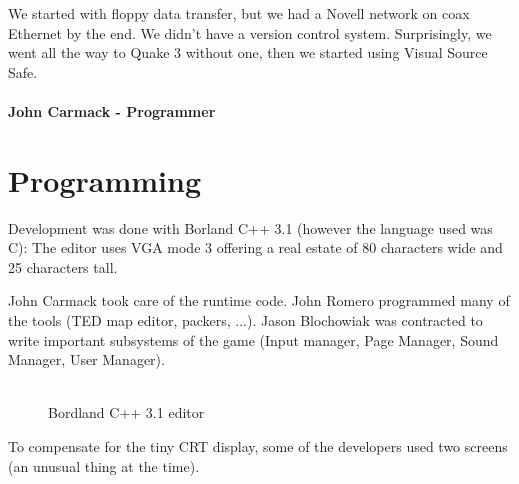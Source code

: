 \documentclass[book.tex]{subfiles}
\begin{document}
 \begin{fancyquotes}
We started with floppy data transfer, but we had a Novell network on coax Ethernet by the end. We didn't have a version control system.  Surprisingly, we went all the way to Quake 3 without one, then we started using Visual Source Safe.\\
 \\
\textbf{John Carmack - Programmer}
\end{fancyquotes}


























\section{Programming}



Development was done with Borland C++ 3.1 (however the language used was C): The editor uses VGA mode 3 offering a real estate of 80 characters wide and 25 characters tall.\\
\par
John Carmack took care of the runtime code. John Romero programmed many of the tools (TED map editor, packers, ...). Jason Blochowiak was contracted to write important subsystems of the game (Input manager, Page Manager, Sound Manager, User Manager).\\
\\
\begin{figure}[H]
\centering
\caption{Bordland C++ 3.1 editor}
\end{figure}


To compensate for the tiny CRT display, some of the developers used two screens (an unusual thing at the time).\\
\end{document}
